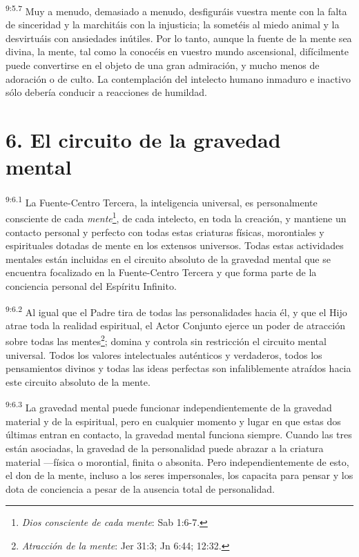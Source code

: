 \par
\textsuperscript{9:5.7} Muy a menudo, demasiado a menudo, desfiguráis vuestra mente con la falta de sinceridad y la marchitáis con la injusticia; la sometéis al miedo animal y la desvirtuáis con ansiedades inútiles. Por lo tanto, aunque la fuente de la mente sea divina, la mente, tal como la conocéis en vuestro mundo ascensional, difícilmente puede convertirse en el objeto de una gran admiración, y mucho menos de adoración o de culto. La contemplación del intelecto humano inmaduro e inactivo sólo debería conducir a reacciones de humildad.

\section*{6. El circuito de la gravedad mental}
\par
\textsuperscript{9:6.1} La Fuente-Centro Tercera, la inteligencia universal, es personalmente consciente de cada \textit{mente}\footnote{\textit{Dios consciente de cada mente}: Sab 1:6-7.}, de cada intelecto, en toda la creación, y mantiene un contacto personal y perfecto con todas estas criaturas físicas, morontiales y espirituales dotadas de mente en los extensos universos. Todas estas actividades mentales están incluidas en el circuito absoluto de la gravedad mental que se encuentra focalizado en la Fuente-Centro Tercera y que forma parte de la conciencia personal del Espíritu Infinito.

\par
\textsuperscript{9:6.2} Al igual que el Padre tira de todas las personalidades hacia él, y que el Hijo atrae toda la realidad espiritual, el Actor Conjunto ejerce un poder de atracción sobre todas las mentes\footnote{\textit{Atracción de la mente}: Jer 31:3; Jn 6:44; 12:32.}; domina y controla sin restricción el circuito mental universal. Todos los valores intelectuales auténticos y verdaderos, todos los pensamientos divinos y todas las ideas perfectas son infaliblemente atraídos hacia este circuito absoluto de la mente.

\par
\textsuperscript{9:6.3} La gravedad mental puede funcionar independientemente de la gravedad material y de la espiritual, pero en cualquier momento y lugar en que estas dos últimas entran en contacto, la gravedad mental funciona siempre. Cuando las tres están asociadas, la gravedad de la personalidad puede abrazar a la criatura material ---física o morontial, finita o absonita. Pero independientemente de esto, el don de la mente, incluso a los seres impersonales, los capacita para pensar y los dota de conciencia a pesar de la ausencia total de personalidad.

